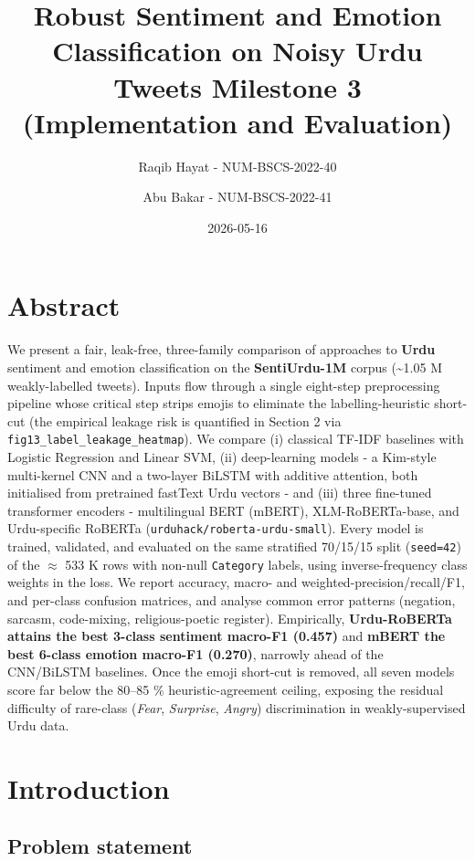 \documentclass[
  english,
  11pt,
]{article}
\title{Robust Sentiment and Emotion Classification on Noisy Urdu Tweets
Milestone 3 (Implementation and Evaluation)}
\author{Raqib Hayat - NUM-BSCS-2022-40 \and Abu Bakar -
NUM-BSCS-2022-41}
\date{2026-05-16}
\begin{document}
\maketitle

\section{Abstract}\label{abstract}

We present a fair, leak-free, three-family comparison of approaches to
\textbf{Urdu} sentiment and emotion classification on the
\textbf{SentiUrdu-1M} corpus (\textasciitilde1.05 M weakly-labelled
tweets). Inputs flow through a single eight-step preprocessing pipeline
whose critical step strips emojis to eliminate the labelling-heuristic
short-cut (the empirical leakage risk is quantified in Section 2 via
\texttt{fig13\_label\_leakage\_heatmap}). We compare (i) classical
TF-IDF baselines with Logistic Regression and Linear SVM, (ii)
deep-learning models - a Kim-style multi-kernel CNN and a two-layer
BiLSTM with additive attention, both initialised from pretrained
fastText Urdu vectors - and (iii) three fine-tuned transformer
encoders - multilingual BERT (mBERT), XLM-RoBERTa-base, and
Urdu-specific RoBERTa (\texttt{urduhack/roberta-urdu-small}). Every
model is trained, validated, and evaluated on the same stratified
70/15/15 split (\texttt{seed=42}) of the \(\approx\) 533 K rows with
non-null \texttt{Category} labels, using inverse-frequency class weights
in the loss. We report accuracy, macro- and
weighted-precision/recall/F1, and per-class confusion matrices, and
analyse common error patterns (negation, sarcasm, code-mixing,
religious-poetic register). Empirically, \textbf{Urdu-RoBERTa attains
the best 3-class sentiment macro-F1 (0.457)} and \textbf{mBERT the best
6-class emotion macro-F1 (0.270)}, narrowly ahead of the CNN/BiLSTM
baselines. Once the emoji short-cut is removed, all seven models score
far below the 80--85 \% heuristic-agreement ceiling, exposing the
residual difficulty of rare-class (\emph{Fear}, \emph{Surprise},
\emph{Angry}) discrimination in weakly-supervised Urdu data.

\newpage

\section{Introduction}\label{introduction}

\subsection{Problem statement}\label{problem-statement}
\end{document}
